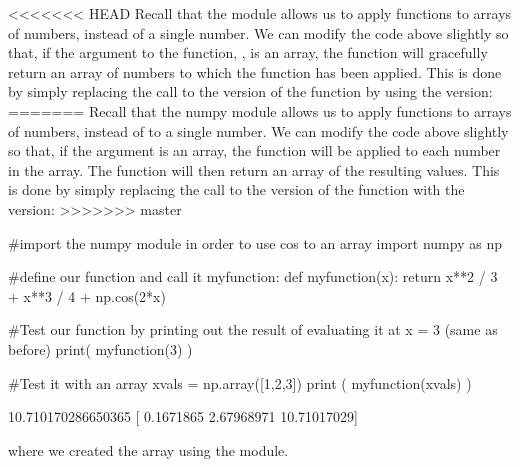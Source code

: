 <<<<<<< HEAD
Recall that the  module allows us to apply functions to arrays of numbers, instead of a single number. We can modify the code above slightly so that, if the argument to the function, , is an array, the function will gracefully return an array of numbers to which the function has been applied. This is done by simply replacing the call to the  version of the  function by using the  version:
=======
Recall that the numpy module allows us to apply functions to arrays of numbers, instead of to a single number. We can modify the code above slightly so that, if the argument  is an array, the function will be applied to each number in the array. The function will then return an array of the resulting values. This is done by simply replacing the call to the  version of the  function with the  version:
>>>>>>> master
\begin{python}[caption=Defining a function that works on an array] 
#import the numpy module in order to use cos to an array
import numpy as np

#define our function and call it myfunction:
def myfunction(x):
  return x**2 / 3 + x**3 / 4 + np.cos(2*x)
  
#Test our function by printing out the result of evaluating it at x = 3 (same as before)
print( myfunction(3) )  

#Test it with an array
xvals = np.array([1,2,3])
print ( myfunction(xvals) )  

\end{python}
\begin{poutput}
10.710170286650365
[ 0.1671865   2.67968971 10.71017029]
\end{poutput}
where we created the array  using the  module.

